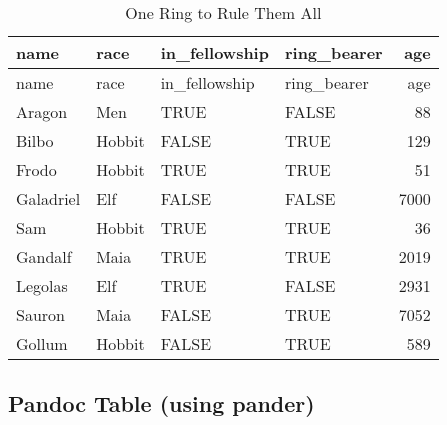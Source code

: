 \documentclass[
]{article}
\begin{document}
\begin{longtable}[]{@{}llllr@{}}
\caption{One Ring to Rule Them All}\tabularnewline
\toprule
name & race & in\_fellowship & ring\_bearer & age\tabularnewline
\midrule
\endfirsthead
\toprule
name & race & in\_fellowship & ring\_bearer & age\tabularnewline
\midrule
\endhead
Aragon & Men & TRUE & FALSE & 88\tabularnewline
Bilbo & Hobbit & FALSE & TRUE & 129\tabularnewline
Frodo & Hobbit & TRUE & TRUE & 51\tabularnewline
Galadriel & Elf & FALSE & FALSE & 7000\tabularnewline
Sam & Hobbit & TRUE & TRUE & 36\tabularnewline
Gandalf & Maia & TRUE & TRUE & 2019\tabularnewline
Legolas & Elf & TRUE & FALSE & 2931\tabularnewline
Sauron & Maia & FALSE & TRUE & 7052\tabularnewline
Gollum & Hobbit & FALSE & TRUE & 589\tabularnewline
\bottomrule
\end{longtable}

\hypertarget{pandoc-table-using-pander}{%
\subsection{Pandoc Table (using
pander)}\label{pandoc-table-using-pander}}
\end{document}
